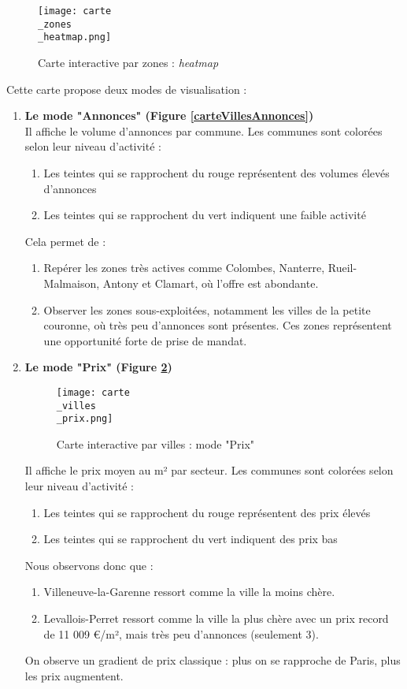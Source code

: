 \documentclass[a4paper, 12pt, twoside]{report}
\begin{document}
		\begin{figure}[h]
			\centering
			\texttt{[image: carte\\\_zones\\\_heatmap.png]}
			\caption{Carte interactive par zones : {\it heatmap}}
			\label{carteZonesHeatmap}
		\end{figure}	

		Cette carte propose deux modes de visualisation : \\
		\begin{enumerate}
			\item {\bf Le mode "Annonces" (Figure \ref{carteVillesAnnonces})} \\
			Il affiche le volume d’annonces par commune. Les communes sont colorées selon leur niveau d’activité :
			\begin{enumerate}
				\item Les teintes qui se rapprochent du rouge représentent des volumes élevés d’annonces
				\item Les teintes qui se rapprochent du vert indiquent une faible activité
			\end{enumerate}
			Cela permet de :
			\begin{enumerate}
				\item Repérer les zones très actives comme Colombes, Nanterre, Rueil-Malmaison, Antony et Clamart, où l’offre est abondante.
				\item Observer les zones sous-exploitées, notamment les villes de la petite couronne, où très peu d’annonces sont présentes. Ces zones représentent une opportunité forte de prise de mandat. \\
			\end{enumerate}
			\item {\bf Le mode "Prix" (Figure \ref{carteVillesPrix})} \\
			\begin{figure}[h]
				\centering
				\texttt{[image: carte\\\_villes\\\_prix.png]}
				\caption{Carte interactive par villes : mode "Prix"}
				\label{carteVillesPrix}
			\end{figure}	
			Il affiche le prix moyen au m² par secteur. Les communes sont colorées selon leur niveau d’activité :
			\begin{enumerate}
				\item Les teintes qui se rapprochent du rouge représentent des prix élevés
				\item Les teintes qui se rapprochent du vert indiquent des prix bas
			\end{enumerate}
			Nous observons donc que :
			\begin{enumerate}
				\item Villeneuve-la-Garenne ressort comme la ville la moins chère.
				\item Levallois-Perret ressort comme la ville la plus chère avec un prix record de 11 009 €/m², mais très peu d’annonces (seulement 3).
			\end{enumerate}
			On observe un gradient de prix classique : plus on se rapproche de Paris, plus les prix augmentent.
		\end{enumerate}
\end{document}
